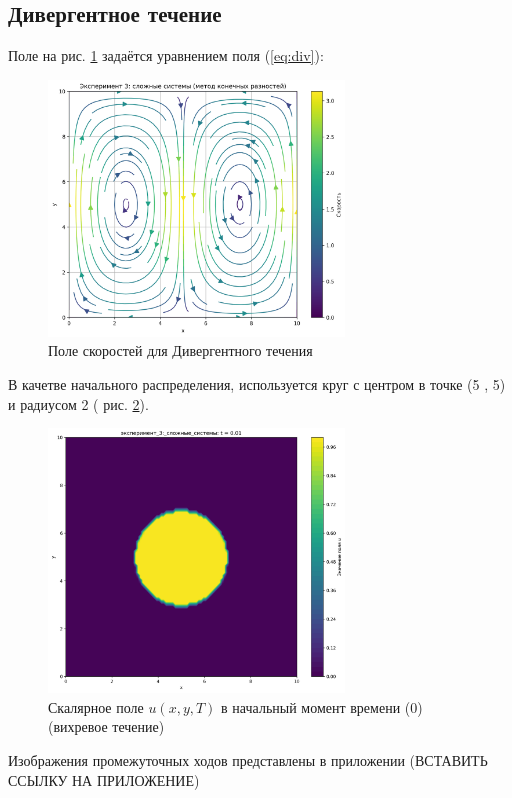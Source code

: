 \subsection{Дивергентное течение}
Поле на рис. \ref{fig:div_velocity} задаётся уравнением поля (\ref{eq:div}):
\begin{figure}[h]
	\centering
	\includegraphics[width=0.7\textwidth]{imgs/эксперимент_3:_сложные_системы_fd_velocity_field.png}
	\caption{Поле скоростей для Дивергентного течения}
	\label{fig:div_velocity}
\end{figure}
В качетве начального распределения, используется круг с центром в точке (5 , 5) и радиусом 2 ( рис. \ref{fig:div_begin}).
\begin{figure}
	\centering
	\includegraphics[width=0.7\textwidth]{imgs/эксперимент_3:_сложные_системы_t0.01.png}
	\caption{Скалярное поле \(u(x,y,T)\) в начальный момент времени (0) (вихревое течение)}
	\label{fig:div_begin}
\end{figure}
Изображения промежуточных ходов представлены в приложении (ВСТАВИТЬ ССЫЛКУ НА ПРИЛОЖЕНИЕ)
